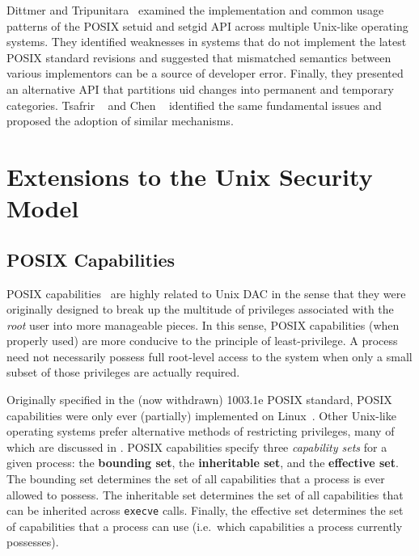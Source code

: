 Dittmer and Tripunitara~\cite{dittmer2014_setuid} examined the implementation and common
usage patterns of the POSIX setuid and setgid API across multiple Unix-like operating
systems. They identified weaknesses in systems that do not implement the latest POSIX
standard revisions and suggested that mismatched semantics between various implementors
can be a source of developer error. Finally, they presented an alternative API that
partitions \gls{uid} changes into permanent and temporary categories. Tsafrir
\etal~\cite{tsafrir2008_setuid} and Chen \etal~\cite{chen2002_setuid} identified the same
fundamental issues and proposed the adoption of similar mechanisms.


%



\section{Extensions to the Unix Security Model}%
\label{s:extensions-bg}

\subsection{POSIX Capabilities}

POSIX capabilities~\cite{posix_capabilities, corbet2006_capabities_a,
corbet2006_capabities_b} are highly related to Unix DAC in the sense that they were
originally designed to break up the multitude of privileges associated with the
\textit{root} user into more manageable pieces. In this sense, POSIX capabilities (when
properly used) are more conducive to the principle of least-privilege. A process need not
necessarily possess full root-level access to the system when only a small subset of those
privileges are actually required.

Originally specified in the (now withdrawn) 1003.1e POSIX standard, POSIX capabilities
were only ever (partially) implemented on Linux~\cite{anderson2017_comparison}. Other
Unix-like operating systems prefer alternative methods of restricting privileges, many of
which are discussed in . POSIX capabilities specify three
\textit{capability sets} for a given process: the \textbf{bounding set}, the
\textbf{inheritable set}, and the \textbf{effective set}. The bounding set determines the
set of all capabilities that a process is ever allowed to possess. The inheritable set
determines the set of all capabilities that can be inherited across \texttt{execve} calls.
Finally, the effective set determines the set of capabilities that a process can use
(i.e.~which capabilities a process currently possesses).

